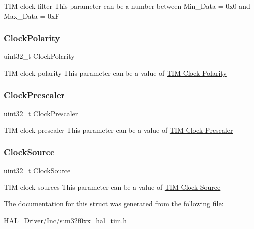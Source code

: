 T\+IM clock filter This parameter can be a number between Min\+\_\+\+Data = 0x0 and Max\+\_\+\+Data = 0xF \mbox{\label{struct_t_i_m___clock_config_type_def_a765acd064e3a8fb99ec74ae5109fc5ec}} 
\subsubsection{\texorpdfstring{Clock\+Polarity}{ClockPolarity}}
{\footnotesize\ttfamily uint32\+\_\+t Clock\+Polarity}

T\+IM clock polarity This parameter can be a value of \hyperlink{group___t_i_m___clock___polarity}{T\+IM Clock Polarity} \mbox{\label{struct_t_i_m___clock_config_type_def_ab791f8fac403d508e1c53b6f27cf1f24}} 
\subsubsection{\texorpdfstring{Clock\+Prescaler}{ClockPrescaler}}
{\footnotesize\ttfamily uint32\+\_\+t Clock\+Prescaler}

T\+IM clock prescaler This parameter can be a value of \hyperlink{group___t_i_m___clock___prescaler}{T\+IM Clock Prescaler} \mbox{\label{struct_t_i_m___clock_config_type_def_afe27815154e535b96e8fa1b4d2fdd596}} 
\subsubsection{\texorpdfstring{Clock\+Source}{ClockSource}}
{\footnotesize\ttfamily uint32\+\_\+t Clock\+Source}

T\+IM clock sources This parameter can be a value of \hyperlink{group___t_i_m___clock___source}{T\+IM Clock Source} 

The documentation for this struct was generated from the following file\+:\begin{DoxyCompactItemize}
\item 
H\+A\+L\+\_\+\+Driver/\+Inc/\hyperlink{stm32f0xx__hal__tim_8h}{stm32f0xx\+\_\+hal\+\_\+tim.\+h}\end{DoxyCompactItemize}
